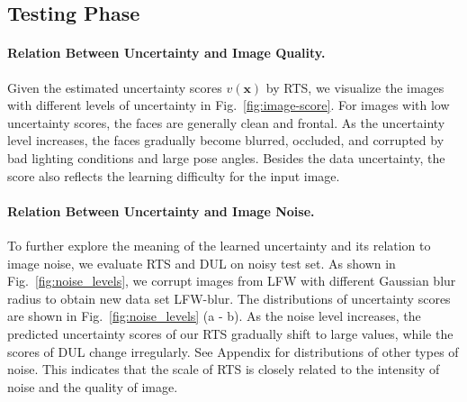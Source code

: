 \documentclass[letterpaper]{article} %
\begin{document}
\subsection{Testing Phase}
\label{ssec:testing phase}
\paragraph{Relation Between Uncertainty and Image Quality.}
Given the estimated uncertainty scores $v(\bm{x})$ by RTS, we visualize the images with different levels of uncertainty in Fig.~\ref{fig:image-score}. For images with low uncertainty scores, the faces are generally clean and frontal. As the uncertainty level increases, the faces gradually become blurred, occluded, and corrupted by bad lighting conditions and large pose angles. Besides the data uncertainty, the score also reflects the learning difficulty for the input image.

\paragraph{Relation Between Uncertainty and Image Noise.}
To further explore the meaning of the learned uncertainty and its relation to image noise, we evaluate RTS and DUL on noisy test set. As shown in Fig.~\ref{fig:noise_levels}, we corrupt images from LFW with different Gaussian blur radius to obtain new data set LFW-blur.
%
The distributions of uncertainty scores are shown in Fig.~\ref{fig:noise_levels} (a - b). As the noise level increases, the predicted uncertainty scores of our RTS gradually shift to large values, while the scores of DUL change irregularly.
%
See Appendix for distributions of other types of noise.
%
This indicates that the scale of RTS is closely related to the intensity of noise and the quality of image.
\end{document}
